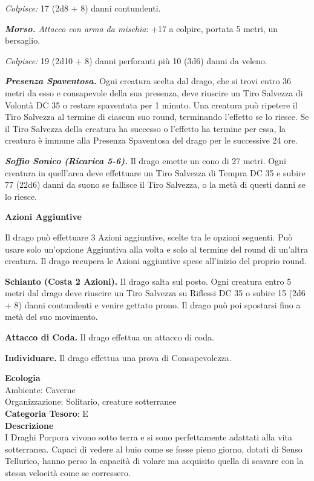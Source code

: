 \begin{multicols}{2}
{\emph{Colpisce:} 17 (2d8 + 8) danni contundenti.

\emph{\textbf{Morso.} Attacco con arma da mischia}: +17 a colpire, portata 5 metri, un bersaglio.

\emph{Colpisce:} 19 (2d10 + 8) danni perforanti più 10 (3d6) danni da veleno.

\emph{\textbf{Presenza Spaventosa.}} Ogni creatura scelta dal drago, che si trovi entro 36 metri da esso e consapevole della sua presenza, deve riuscire un Tiro Salvezza di Volontà DC 35 o restare spaventata per 1 minuto. Una creatura può ripetere il Tiro Salvezza al termine di ciascun suo round, terminando l'effetto se lo riesce. Se il Tiro Salvezza della creatura ha successo o l'effetto ha termine per essa, la creatura è immune alla Presenza Spaventosa del drago per le successive 24 ore.

\emph{\textbf{Soffio Sonico (Ricarica 5-6).}} Il drago emette un cono di 27 metri. Ogni creatura in quell'area deve effettuare un Tiro Salvezza di Tempra DC 35 e subire 77 (22d6) danni da suono se fallisce il Tiro Salvezza, o la metà di questi danni se lo riesce.

\textbf{Azioni Aggiuntive}

Il drago può effettuare 3 Azioni aggiuntive, scelte tra le opzioni seguenti. Può usare solo un'opzione Aggiuntiva alla volta e solo al termine del round di un'altra creatura. Il drago recupera le Azioni aggiuntive spese all'inizio del proprio round.

\textbf{Schianto (Costa 2 Azioni).} Il drago salta sul posto. Ogni creatura entro 5 metri dal drago deve riuscire un Tiro Salvezza su Riflessi DC 35 o subire 15 (2d6 + 8) danni contundenti e venire gettato prono. Il drago può poi spostarsi fino a metà del suo movimento.

\textbf{Attacco di Coda.} Il drago effettua un attacco di coda.

\textbf{Individuare.} Il drago effettua una prova di Consapevolezza.

\textbf{Ecologia}\\
Ambiente: Caverne\\
Organizzazione: Solitario, creature sotterranee\\
\textbf{Categoria Tesoro}: E\\
\textbf{Descrizione}\\
I Draghi Porpora vivono sotto terra e si sono perfettamente adattati alla vita sotterranea.
Capaci di vedere al buio come se fosse pieno giorno, dotati di Senso Tellurico, hanno perso la capacità di volare ma acquisito quella di scavare con la stessa velocità come se corressero.

}
\end{multicols}
